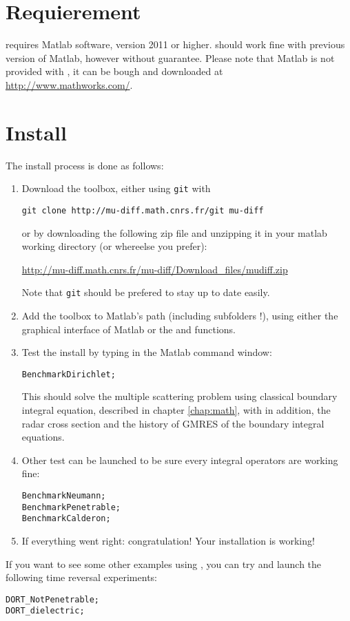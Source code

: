 \mtcaddchapter[Installation]                          %

\section*{Requierement}

\mudiff requires Matlab software, version 2011 or higher. \mudiff should work fine with previous version of Matlab, however without guarantee. Please note that Matlab is not provided with \mudiff, it can be bough and downloaded at \url{http://www.mathworks.com/}.

\section*{Install}

The install process is done as follows:
\begin{enumerate}
\item Download the \mudiff toolbox, either using \texttt{git} with
\begin{verbatim}
git clone http://mu-diff.math.cnrs.fr/git mu-diff
\end{verbatim} 
or by downloading the following zip file and unzipping it in your matlab working directory (or whereelse you prefer):
\begin{center}
\url{http://mu-diff.math.cnrs.fr/mu-diff/Download_files/mudiff.zip}
\end{center}
Note that \texttt{git} should be prefered to stay up to date easily.
\item Add the \mudiff toolbox to Matlab's path (including subfolders !), using either the graphical interface of Matlab or the  and  functions.
\item Test the \mudiff install by typing in the Matlab command window:
\begin{lstlisting}
BenchmarkDirichlet;
\end{lstlisting}
This should solve the multiple scattering problem using classical boundary integral equation, described in chapter \ref{chap:math}, with in addition, the radar cross section and the history of GMRES of the boundary integral equations.
\item Other test can be launched to be sure every integral operators are working fine:
\begin{lstlisting}
BenchmarkNeumann;
BenchmarkPenetrable;
BenchmarkCalderon;
\end{lstlisting}
\item If everything went right: congratulation! Your \mudiff installation is working!
\end{enumerate}

If you want to see some other examples using \mudiff, you can try and launch the following time reversal experiments:
\begin{lstlisting}
DORT_NotPenetrable;
DORT_dielectric;
\end{lstlisting}
